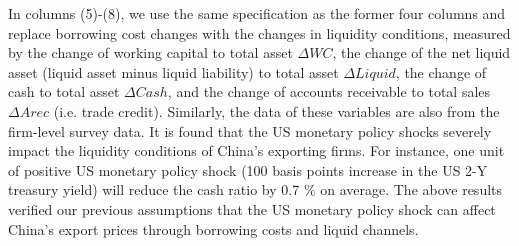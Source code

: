 In columns (5)-(8), we use the same specification as the former four columns and replace borrowing cost changes with the changes in liquidity conditions, measured by the change of working capital to total asset $\Delta WC$, the change of the net liquid asset (liquid asset minus liquid liability) to total asset $\Delta Liquid$, the change of cash to total asset $\Delta Cash$, and the change of accounts receivable to total sales $\Delta Arec$ (i.e. trade credit). Similarly, the data of these variables are also from the firm-level survey data. It is found that the US monetary policy shocks severely impact the liquidity conditions of China's exporting firms. For instance, one unit of positive US monetary policy shock (100 basis points increase in the US 2-Y treasury yield) will reduce the cash ratio by 0.7 $\%$ on average. The above results verified our previous assumptions that the US monetary policy shock can affect China's export prices through borrowing costs and liquid channels.

